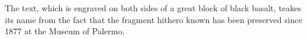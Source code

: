 \documentclass[12pt,oneside]{book}
\begin{document}


The text, which is engraved on both sides of a great block of black basalt, teakes its name from the fact that the fragment hithero known has been preserved since 1877 at the Museum of Palermo. 
\end{document}
